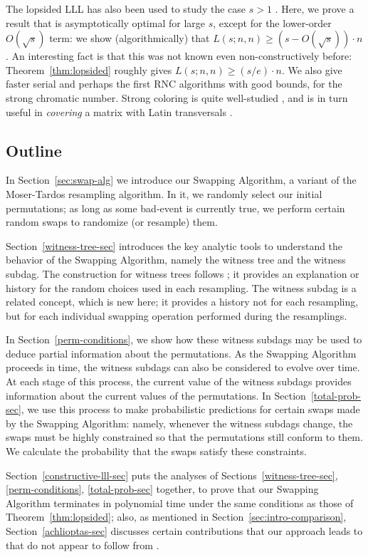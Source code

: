 The lopsided LLL has also been used to study the case $s > 1$ \cite{szabo:transversals}. Here, we prove a result that is asymptotically optimal for large $s$, except for the lower-order $O(\sqrt{s})$ term: we show (algorithmically) that $L(s; n, n) \geq (s - O(\sqrt{s})) \cdot n$. An interesting fact is that this was not known even non-constructively before: Theorem~\ref{thm:lopsided} roughly gives $L(s; n, n) \geq (s/e) \cdot n$. We also give faster serial and perhaps the first RNC algorithms with good bounds, for the strong chromatic number. Strong coloring is quite well-studied \cite{alon1992,axenovich,fellows,haxell2004,haxell2008}, and is in turn useful in \emph{covering} a matrix with Latin transversals \cite{alon-spencer-tetali}.

\subsection{Outline}
In Section~\ref{sec:swap-alg} we introduce our Swapping Algorithm, a variant of the Moser-Tardos resampling algorithm. In it, we randomly select our initial permutations; as long as some bad-event is currently true, we perform certain random swaps to randomize (or resample) them.

Section~\ref{witness-tree-sec} introduces the key analytic tools to understand the behavior of the Swapping Algorithm, namely the witness tree and the witness subdag. The construction for witness trees follows \cite{moser-tardos}; it provides an explanation or history for the random choices used in each resampling. The witness subdag is a related concept, which is new here; it provides a history not for each resampling, but for each individual swapping operation performed during the resamplings.

In Section~\ref{perm-conditions}, we show how these witness subdags may be used to deduce partial information about the permutations. As the Swapping Algorithm proceeds in time, the witness subdags can also be considered to evolve over time. At each stage of this process, the current value of the witness subdags provides information about the current values of the permutations.
In Section~\ref{total-prob-sec}, we use this process to make probabilistic predictions for certain swaps made by the Swapping Algorithm: namely, whenever the witness subdags change, the swaps must be highly constrained so that the permutations still conform to them. We calculate the probability that the swaps satisfy these constraints.

Section~\ref{constructive-lll-sec} puts the analyses of Sections~\ref{witness-tree-sec}, \ref{perm-conditions}, \ref{total-prob-sec} together, to prove that our Swapping Algorithm terminates in polynomial time under the same conditions as those of Theorem~\ref{thm:lopsided}; also, as mentioned in Section~\ref{sec:intro-comparison}, Section~\ref{achlioptas-sec} discusses certain contributions that our approach leads to that do not appear to follow from  
\cite{achlioptas,harvey,kolmogorov}.

